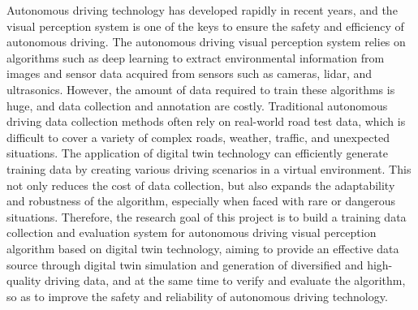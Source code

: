 \begin{abstracten}

Autonomous driving technology has developed rapidly in recent years, and the visual perception system is one of the keys to ensure the safety and efficiency of autonomous driving. The autonomous driving visual perception system relies on algorithms such as deep learning to extract environmental information from images and sensor data acquired from sensors such as cameras, lidar, and ultrasonics. However, the amount of data required to train these algorithms is huge, and data collection and annotation are costly. Traditional autonomous driving data collection methods often rely on real-world road test data, which is difficult to cover a variety of complex roads, weather, traffic, and unexpected situations. The application of digital twin technology can efficiently generate training data by creating various driving scenarios in a virtual environment. This not only reduces the cost of data collection, but also expands the adaptability and robustness of the algorithm, especially when faced with rare or dangerous situations. Therefore, the research goal of this project is to build a training data collection and evaluation system for autonomous driving visual perception algorithm based on digital twin technology, aiming to provide an effective data source through digital twin simulation and generation of diversified and high-quality driving data, and at the same time to verify and evaluate the algorithm, so as to improve the safety and reliability of autonomous driving technology.



\end{abstracten}